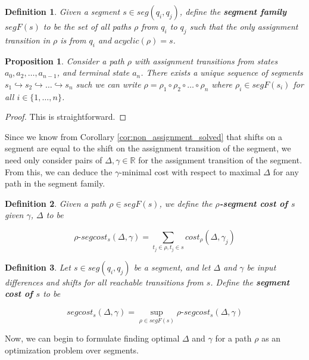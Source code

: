 \documentclass{article}
\newcommand{\R}{\mathbb{R}}
\newtheorem{proposition}{Proposition}[section]
\newtheorem{definition}{Definition}[section]
\newcommand{\1}{\langle 1 \rangle}
\newcommand{\2}{\langle 2 \rangle}
\begin{document}
\begin{definition}
    Given a segment $s \in seg(q_i, q_j)$, define the \textbf{segment family} $segF(s)$ to be the set of all paths $\rho$ from $q_i$ to $q_j$ such that the only assignment transition in $\rho$ is from $q_i$ and $acyclic(\rho) = s$.
\end{definition}

\begin{proposition}
    \label{prop:segmenting}
    Consider a path $\rho$ with assignment transitions from states $a_0, a_2, \dots, a_{n - 1}$, and terminal state $a_n$. There exists a unique sequence of segments $s_1 \hookrightarrow s_2 \hookrightarrow \dots \hookrightarrow s_n$ such we can write $\rho = \rho_1 \circ \rho_2 \circ \dots \circ \rho_n$ where $\rho_i \in segF(s_i)$ for all $i \in \{1, \dots, n\}$.
\end{proposition} 

\begin{proof}
    This is straightforward.
\end{proof}

Since we know from Corollary \ref{cor:non_assignment_solved} that shifts on a segment are equal to the shift on the assignment transition of the segment, we need only consider pairs of $\Delta, \gamma \in \R$ for the assignment transition of the segment. From this, we can deduce the $\gamma$-minimal cost with respect to maximal $\Delta$ for any path in the segment family.

\begin{definition}
    Given a path $\rho \in segF(s)$, we define the $\rho$\textbf{-segment cost of $s$} given $\gamma$, $\Delta$ to be 

    \[\rho\text{-}segcost_{s}(\Delta, \gamma) = \sum_{t_j \in \rho, t_j \in s} cost_{\rho} (\Delta, \gamma_j) \]
\end{definition}

\begin{definition}
    Let $s \in seg(q_i, q_j)$ be a segment, and let $\Delta$ and $\gamma$ be input differences and shifts for all reachable transitions from $s$. Define the \textbf{segment cost of $s$} to be

    \[segcost_{s}(\Delta, \gamma) = \sup_{\rho \in segF(s)} \rho\text{-}segcost_{s}(\Delta, \gamma) \]
\end{definition}

Now, we can begin to formulate finding optimal $\Delta$ and $\gamma$ for a path $\rho$ as an optimization problem over segments.
\end{document}
